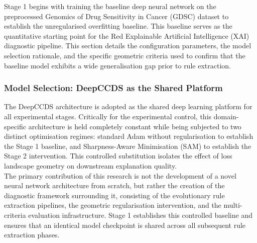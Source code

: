 \label{ssub:method_ann}
Stage 1 begins with training the baseline deep neural network on the preprocessed 
Genomics of Drug Sensitivity in Cancer (GDSC) dataset to establish the unregularised 
overfitting baseline. This baseline serves as the quantitative starting point for the 
Red Explainable Artificial Intelligence (XAI) diagnostic pipeline. This section 
details the configuration parameters, the model selection rationale, and the specific 
geometric criteria used to confirm that the baseline model exhibits a wide generalisation 
gap prior to rule extraction.

\subsubsection{Model Selection: DeepCCDS as the Shared Platform}
\label{ssub:method_deepccds}
The DeepCCDS architecture \cite{Wu2025} is adopted as the shared deep learning platform 
for all experimental stages. Critically for the experimental control, this 
domain-specific architecture is held completely constant while being subjected to two 
distinct optimisation regimes: standard Adam without regularisation to establish the 
Stage 1 baseline, and Sharpness-Aware Minimisation (SAM) to establish the Stage 2 
intervention. This controlled substitution isolates the effect of loss landscape 
geometry on downstream explanation quality. 
\\
The primary contribution of this research is not the development of a novel neural 
network architecture from scratch, but rather the creation of the diagnostic framework 
surrounding it, consisting of the evolutionary rule extraction pipelines, the geometric 
regularisation intervention, and the multi-criteria evaluation infrastructure. Stage 1 
establishes this controlled baseline and ensures that an identical model checkpoint 
is shared across all subsequent rule extraction phases.

